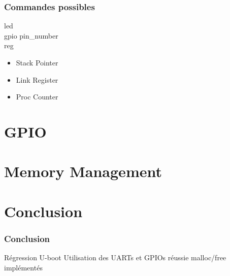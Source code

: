 \documentclass{beamer}
\begin{document}
\begin{frame}
\frametitle{Commandes possibles}
  \textsf{led} \\
  \textsf{gpio pin\_number} \\
  \textsf{reg} \\
    \begin{itemize}
    \item Stack Pointer
    \item Link Register
    \item Proc Counter
    \end{itemize}
\end{frame}



\begin{frame}
\frametitle{ }
\end{frame}

\section{GPIO}
\subsection{ }

\begin{frame}
\frametitle{ }
\end{frame}

\section{Memory Management}
\subsection{ }
\begin{frame}
  \frametitle{}
\end{frame}

\let\origaddtocontents=\addtocontents
\def\dontaddtocontents#1#2{}
\let\addtocontents=\dontaddtocontents
\section*{Conclusion}
\let\addtocontents=\origaddtocontents

\begin{frame}
  \frametitle{Conclusion}
Régression U-boot
Utilisation des UARTs et GPIOs réussie
malloc/free implémentés
\end{frame}
\end{document}
